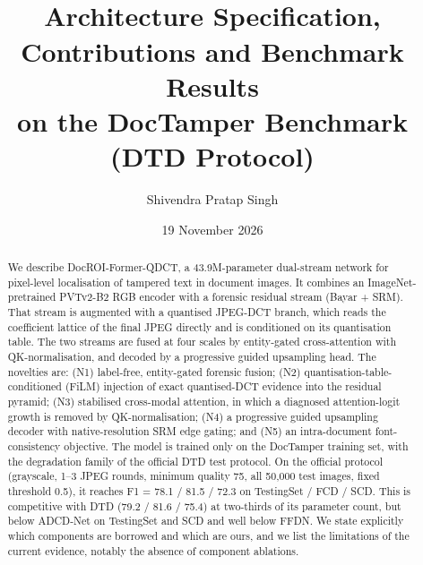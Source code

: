 \documentclass[10pt,a4paper]{article}
\title{\textbf{\ours}\\[2pt]
\large Architecture Specification, Contributions and Benchmark Results\\
on the DocTamper Benchmark (DTD Protocol)}
\author{Shivendra Pratap Singh}
\date{19 November 2026}
\newcommand{\ours}{DocROI-Former-QDCT}
\begin{document}
\maketitle

\begin{abstract}
\noindent
We describe \ours, a 43.9M-parameter dual-stream network for pixel-level localisation of
tampered text in document images. It combines an ImageNet-pretrained PVTv2-B2 RGB
encoder with a forensic residual stream (Bayar + SRM). That stream is augmented with a
quantised JPEG-DCT branch, which reads the coefficient lattice of the final JPEG directly
and is conditioned on its quantisation table. The two streams are fused at four scales by
entity-gated cross-attention with QK-normalisation, and decoded by a progressive guided
upsampling head. The novelties are: (N1) label-free, entity-gated forensic fusion;
(N2) quantisation-table-conditioned (FiLM) injection of exact quantised-DCT evidence into
the residual pyramid; (N3) stabilised cross-modal attention, in which a diagnosed
attention-logit growth is removed by QK-normalisation; (N4) a progressive guided
upsampling decoder with native-resolution SRM edge gating; and (N5) an intra-document
font-consistency objective. The model is trained only on the DocTamper training set, with the
degradation family of the official DTD test protocol. On the official protocol
(grayscale, 1--3 JPEG rounds, minimum quality 75, all 50{,}000 test images, fixed
threshold 0.5), it reaches F1 = 78.1 / 81.5 / 72.3 on TestingSet / FCD / SCD. This is
competitive with DTD (79.2 / 81.6 / 75.4) at two-thirds of its parameter count, but below
ADCD-Net on TestingSet and SCD and well below FFDN. We state explicitly which components
are borrowed and which are ours, and we list the limitations of the current evidence,
notably the absence of component ablations.
\end{abstract}

\end{document}
